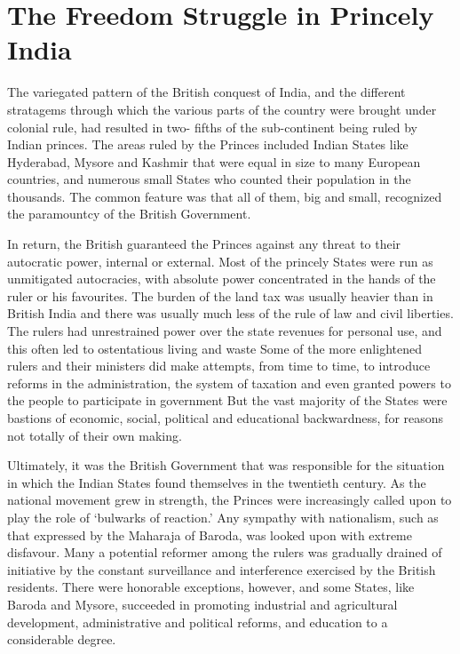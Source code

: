 \chapter{The Freedom Struggle in Princely India}
\begin{multicols}{2}

The variegated pattern of the British conquest of India, and the different stratagems through which the various parts of the country were brought under colonial rule, had resulted in two- fifths of the sub-continent being ruled by Indian princes. The areas ruled by the Princes included Indian States like Hyderabad, Mysore and Kashmir that were equal in size to many European countries, and numerous small States who counted their population in the thousands. The common feature was that all of them, big and small, recognized the paramountcy of the British Government. 

In return, the British guaranteed the Princes against any threat to their autocratic power, internal or external. Most of the princely States were run as unmitigated autocracies, with absolute power concentrated in the hands of the ruler or his favourites. The burden of the land tax was usually heavier than in British India and there was usually much less of the rule of law and civil liberties. The rulers had unrestrained power over the state revenues for personal use, and this often led to ostentatious living and waste Some of the more enlightened rulers and their ministers did make attempts, from time to time, to introduce reforms in the administration, the system of taxation and even granted powers to the people to participate in government But the vast majority of the States were bastions of economic, social, political and educational backwardness, for reasons not totally of their own making. 

Ultimately, it was the British Government that was responsible for the situation in which the Indian States found themselves in the twentieth century. As the national movement grew in strength, the Princes were increasingly called upon to play the role of `bulwarks of reaction.' Any sympathy with nationalism, such as that expressed by the Maharaja of Baroda, was looked upon with extreme disfavour. Many a potential reformer among the rulers was gradually drained of initiative by the constant surveillance and interference exercised by the British residents. There were honorable exceptions, however, and some States, like Baroda and Mysore, succeeded in promoting industrial and agricultural development, administrative and political reforms, and education to a considerable degree.


\end{multicols}
